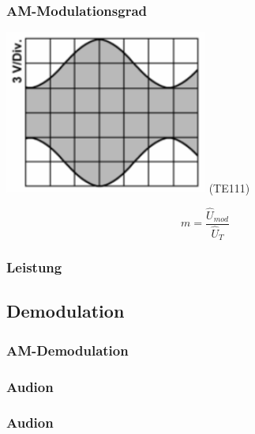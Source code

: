 \begin{frame}
    \frametitle{AM-Modulationsgrad}

    \begin{center}
        \includegraphics[width=0.5\textwidth]{a12/TE111.png}
        \tiny (TE111)
    \end{center}
   
    \begin{equation*}
        m = \frac{\hat{U}_{mod}}{\hat{U}_T}
    \end{equation*}

\end{frame}

\subsubsection{Leistung}

\subsection{Demodulation}

\begin{frame}
    \frametitle{AM-Demodulation}


\end{frame}

\subsubsection{Audion}

\begin{frame}
    \frametitle{Audion}


\end{frame}


